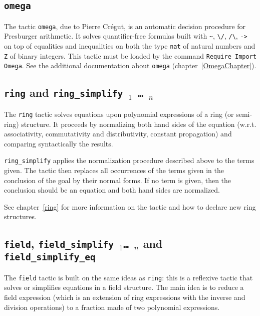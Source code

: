 \subsection{\tt omega
\label{omega}}

The tactic \texttt{omega}, due to Pierre Cr{\'e}gut,
is an automatic decision procedure for Presburger
arithmetic. It solves quantifier-free 
formulas built with \verb|~|, \verb|\/|, \verb|/\|,
\verb|->| on top of equalities and inequalities on
both the type \texttt{nat} of natural numbers and \texttt{Z} of binary
integers. This tactic must be loaded by the command \texttt{Require Import
  Omega}. See the additional documentation about \texttt{omega}
(chapter~\ref{OmegaChapter}).

\subsection{{\tt ring} and {\tt ring\_simplify \term$_1$ \dots\ \term$_n$}
}

The {\tt ring} tactic solves equations upon polynomial expressions of
a ring (or semi-ring) structure. It proceeds by normalizing both hand
sides of the equation (w.r.t. associativity, commutativity and
distributivity, constant propagation) and comparing syntactically the
results.

{\tt ring\_simplify} applies the normalization procedure described
above to the terms given. The tactic then replaces all occurrences of
the terms given in the conclusion of the goal by their normal
forms. If no term is given, then the conclusion should be an equation
and both hand sides are normalized.

See chapter~\ref{ring} for more information on the tactic and how to
declare new ring structures.

\subsection{{\tt field}, {\tt field\_simplify \term$_1$\dots\ \term$_n$}
            and {\tt field\_simplify\_eq}
}

The {\tt field} tactic is built on the same ideas as {\tt ring}: this
is a reflexive tactic that solves or simplifies equations in a field
structure. The main idea is to reduce a field expression (which is an
extension of ring expressions with the inverse and division
operations) to a fraction made of two polynomial expressions.

